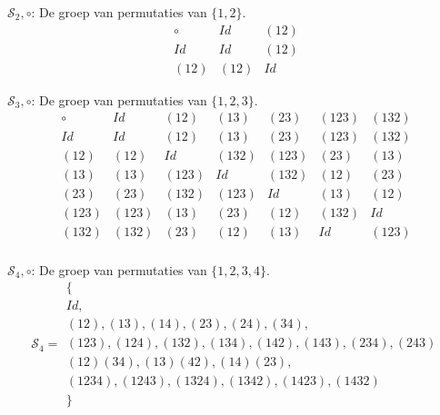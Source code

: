 \documentclass[main.tex]{subfiles}
\begin{document}
\begin{vb}
  $\mathcal{S}_{2},\circ$: De groep van permutaties van $\{ 1,2 \}$.\\
  \[
  \begin{array}{c|cc}
    \circ & Id & (12) \\
    \hline
    Id & Id & (12)\\
    (12) & (12) & Id
  \end{array}
  \]
\commj
\end{vb}

\begin{vb}
  $\mathcal{S}_{3},\circ$: De groep van permutaties van $\{ 1,2,3 \}$.\\
  \[
  \begin{array}{c|cccccc}
    \circ & Id & (12) & (13) & (23) & (123) & (132) \\
    \hline
    Id & Id & (12) & (13) & (23) & (123) & (132)\\
    (12) & (12) & Id & (132) & (123) & (23) & (13)\\
    (13) & (13) & (123) & Id & (132) & (12) & (23)\\
    (23) & (23) & (132) & (123) & Id & (13) & (12)\\
    (123) & (123) & (13) & (23) & (12) & (132) & Id\\
    (132) & (132) & (23) & (12) & (13) & Id & (123)\\
  \end{array}
  \]
\end{vb}

\begin{vb}
  $\mathcal{S}_{4},\circ$: De groep van permutaties van $\{ 1,2,3,4 \}$.\\
  \[
  \mathcal{S}_{4} =
  \begin{array}{l}
     \{\\
     Id,\\
     (12), (13), (14), (23), (24), (34),\\
     (123), (124), (132), (134), (142), (143), (234), (243)\\
     (12)(34), (13)(42), (14)(23),\\
     (1234), (1243), (1324), (1342), (1423), (1432)\\
     \}
  \end{array}
  \]
\end{vb}
\end{document}
